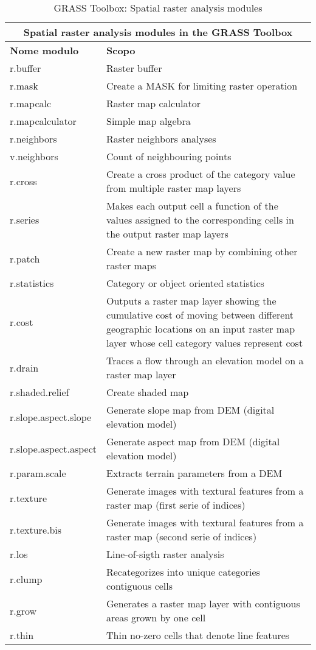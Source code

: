 \begin{table}[ht]
\centering
\caption{GRASS Toolbox: Spatial raster analysis modules}\medskip
 \begin{tabular}{|p{4cm}|p{12cm}|}
  \hline \multicolumn{2}{|c|}{\textbf{Spatial raster analysis modules in the
  GRASS Toolbox}} \\
  \hline \textbf{Nome modulo} & \textbf{Scopo} \\
  \hline r.buffer & Raster buffer \\
  \hline r.mask & Create a MASK for limiting raster operation \\
  \hline r.mapcalc & Raster map calculator \\
  \hline r.mapcalculator & Simple map algebra \\
  \hline r.neighbors & Raster neighbors analyses \\
  \hline v.neighbors & Count of neighbouring points \\
  \hline r.cross & Create a cross product of the category value from multiple
  raster map layers \\
  \hline r.series & Makes each output cell a function of the values assigned
  to the corresponding cells in the output raster map layers\\
  \hline r.patch & Create a new raster map by combining other raster maps \\
  \hline r.statistics & Category or object oriented statistics \\
  \hline r.cost & Outputs a raster map layer showing the cumulative cost of
  moving between different geographic locations on an input raster map layer
  whose cell category values represent cost\\
  \hline r.drain & Traces a flow through an elevation model on a raster map
  layer \\
  \hline r.shaded.relief & Create shaded map \\
  \hline r.slope.aspect.slope & Generate slope map from DEM (digital
  elevation model) \\
  \hline r.slope.aspect.aspect & Generate aspect map from DEM (digital
  elevation model) \\
  \hline r.param.scale & Extracts terrain parameters from a DEM \\
  \hline r.texture & Generate images with textural features from a raster map
  (first serie of indices)\\
  \hline r.texture.bis & Generate images with textural features from a raster
  map (second serie of indices)\\
  \hline r.los & Line-of-sigth raster analysis \\
  \hline r.clump & Recategorizes into unique categories contiguous cells \\
  \hline r.grow & Generates a raster map layer with contiguous areas grown by
  one cell\\
  \hline r.thin & Thin no-zero cells that denote line features \\
\hline
\end{tabular}
\end{table}

